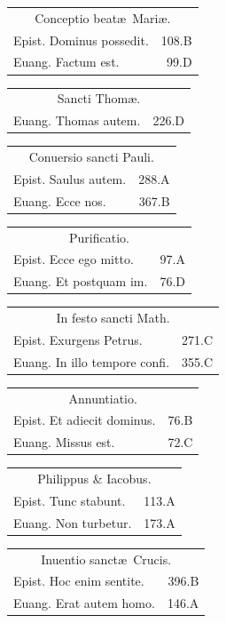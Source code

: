 \documentclass[a5paper,10pt]{book}
\def\ae{æ}
\begin{document}
\begin{multicols}{2}
\begin{tabular}{l r}
\multicolumn{2}{c}{\color{red} Conceptio beat\ae \ Mari\ae .}\\
Epist. Dominus possedit. & 108.B\\
Euang. Factum est. & 99.D\\
\end{tabular}
\begin{tabular}{l r}
\multicolumn{2}{c}{\color{red} Sancti Thom\ae .}\\
Euang. Thomas autem. & 226.D\\
\end{tabular}
\begin{tabular}{l r}
\multicolumn{2}{c}{\color{red} Conuersio sancti Pauli.}\\
Epist. Saulus autem. & 288.A\\
Euang. Ecce nos. & 367.B\\
\end{tabular}
\begin{tabular}{l r}
\multicolumn{2}{c}{\color{red} Purificatio.}\\
Epist. Ecce ego mitto. & 97.A\\
Euang. Et postquam im. & 76.D\\
\end{tabular}
\begin{tabular}{l r}
\multicolumn{2}{c}{\color{red} In festo sancti Math.}\\
Epist. Exurgens Petrus. & 271.C\\
Euang. In illo tempore confi. & 355.C\\
\end{tabular}
\begin{tabular}{l r}
\multicolumn{2}{c}{\color{red} Annuntiatio.}\\
Epist. Et adiecit dominus. & 76.B\\
Euang. Missus est. & 72.C\\
\end{tabular}
\begin{tabular}{l r}
\multicolumn{2}{c}{\color{red} Philippus \& Iacobus.}\\
Epist. Tunc stabunt. & 113.A\\
Euang. Non turbetur. & 173.A\\
\end{tabular}
\begin{tabular}{l r}
\multicolumn{2}{c}{\color{red} Inuentio sanct\ae \ Crucis.}\\
Epist. Hoc enim sentite. & 396.B\\
Euang. Erat autem homo. & 146.A\\

\end{tabular}
\end{multicols}
\end{document}
